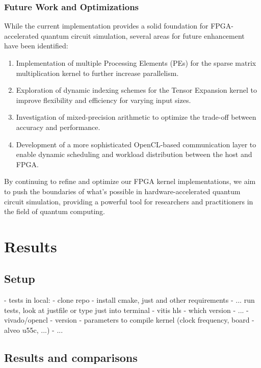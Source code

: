 \documentclass[12pt,oneside,a4paper]{article}
\begin{document}
\subsubsection{Future Work and Optimizations}

While the current implementation provides a solid foundation for FPGA-accelerated quantum circuit simulation, several areas for future enhancement have been identified:

\begin{enumerate}
    \item Implementation of multiple Processing Elements (PEs) for the sparse matrix multiplication kernel to further increase parallelism.
    \item Exploration of dynamic indexing schemes for the Tensor Expansion kernel to improve flexibility and efficiency for varying input sizes.
    \item Investigation of mixed-precision arithmetic to optimize the trade-off between accuracy and performance.
    \item Development of a more sophisticated OpenCL-based communication layer to enable dynamic scheduling and workload distribution between the host and FPGA.
\end{enumerate}

By continuing to refine and optimize our FPGA kernel implementations, we aim to push the boundaries of what's possible in hardware-accelerated quantum circuit simulation, providing a powerful tool for researchers and practitioners in the field of quantum computing.





\section{Results}

\subsection{Setup}
- tests in local:
	- clone repo
	- install cmake, just and other requirements
	- ... run tests, look at justfile or type just into terminal
- vitis hls
	- which version
	- ...
- vivado/opencl
	- version
	- parameters to compile kernel (clock frequency, board - alveo u55c, ...)
	- ...

\subsection{Results and comparisons}
\end{document}
